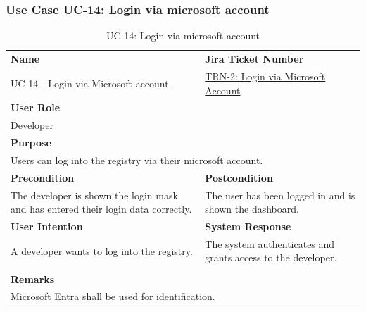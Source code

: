 \subsubsection{Use Case UC-14: Login via microsoft account}\label{subsubsec:use-case-uc-14:-login-via-microsoft-account}

\begin{table}[H]
    \centering
    \begin{tabular}{|p{}|p{}|}

        \hline
        \rowcolor{gray!50}\textbf{Name} & \rowcolor{gray!50}\textbf{Jira Ticket Number} \\
        UC-14 - Login via Microsoft account.
        &
        \href{https://fh-burgenland.atlassian.net/browse/TRN-2}{TRN-2: Login via Microsoft Account} \\ \hline

        \multicolumn{2}{|l|}{\rowcolor{gray!50}\textbf{User Role}} \\
        \multicolumn{2}{|l|}{Developer} \\ \hline

        \multicolumn{2}{|l|}{\rowcolor{gray!50}\textbf{Purpose}} \\
        \multicolumn{2}{|l|}{Users can log into the registry via their microsoft account.} \\ \hline

        \rowcolor{gray!50}\textbf{Precondition} & \rowcolor{gray!50}\textbf{Postcondition} \\
        The developer is shown the login mask and has entered their login data correctly.
        &
        The user has been logged in and is shown the dashboard.  \\ \hline

        \rowcolor{gray!50}\textbf{User Intention} & \rowcolor{gray!50}\textbf{System Response} \\
        A developer wants to log into the registry.
        &
        The system authenticates and grants access to the developer. \\ \hline

        & \\ \hline

        \multicolumn{2}{|l|}{\rowcolor{gray!50}\textbf{Remarks}} \\
        \multicolumn{2}{|p{1\textwidth}|}{Microsoft Entra shall be used for identification.} \\ \hline
    \end{tabular}
    \caption{UC-14: Login via microsoft account}
    \label{tab:uc-login-via-microsoft-account}
\end{table}

